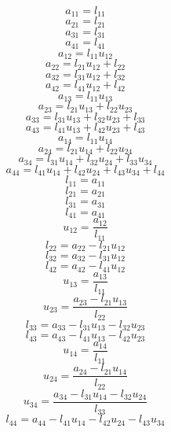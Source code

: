 \documentclass[10pt,a4paper,dvipdfmx]{article}
\begin{document}
\begin{multicols}{2}
$$ a_{{1}{1}} = l_{{1}{1}} $$
$$ a_{{2}{1}} = l_{{2}{1}} $$
$$ a_{{3}{1}} = l_{{3}{1}} $$
$$ a_{{4}{1}} = l_{{4}{1}} $$
$$ a_{{1}{2}} = l_{{1}{1}} u_{{1}{2}} $$
$$ a_{{2}{2}} = l_{{2}{1}} u_{{1}{2}} + l_{{2}{2}} $$
$$ a_{{3}{2}} = l_{{3}{1}} u_{{1}{2}} + l_{{3}{2}} $$
$$ a_{{4}{2}} = l_{{4}{1}} u_{{1}{2}} + l_{{4}{2}} $$
$$ a_{{1}{3}} = l_{{1}{1}} u_{{1}{3}} $$
$$ a_{{2}{3}} = l_{{2}{1}} u_{{1}{3}} + l_{{2}{2}} u_{{2}{3}} $$
$$ a_{{3}{3}} = l_{{3}{1}} u_{{1}{3}} + l_{{3}{2}} u_{{2}{3}} + l_{{3}{3}} $$
$$ a_{{4}{3}} = l_{{4}{1}} u_{{1}{3}} + l_{{4}{2}} u_{{2}{3}} + l_{{4}{3}} $$
$$ a_{{1}{4}} = l_{{1}{1}} u_{{1}{4}} $$
$$ a_{{2}{4}} = l_{{2}{1}} u_{{1}{4}} + l_{{2}{2}} u_{{2}{4}} $$
$$ a_{{3}{4}} = l_{{3}{1}} u_{{1}{4}} + l_{{3}{2}} u_{{2}{4}} + l_{{3}{3}} u_{{3}{4}} $$
$$ a_{{4}{4}} = l_{{4}{1}} u_{{1}{4}} + l_{{4}{2}} u_{{2}{4}} + l_{{4}{3}} u_{{3}{4}} + l_{{4}{4}} $$
\vfill\null
\columnbreak
$$ l_{{1}{1}} = a_{{1}{1}} $$
$$ l_{{2}{1}} = a_{{2}{1}} $$
$$ l_{{3}{1}} = a_{{3}{1}} $$
$$ l_{{4}{1}} = a_{{4}{1}} $$
$$ u_{{1}{2}} = \dfrac{a_{{1}{2}}}{l_{{1}{1}}} $$
$$ l_{{2}{2}} = a_{{2}{2}}- l_{{2}{1}} u_{{1}{2}} $$
$$ l_{{3}{2}} = a_{{3}{2}}- l_{{3}{1}} u_{{1}{2}} $$
$$ l_{{4}{2}} = a_{{4}{2}}- l_{{4}{1}} u_{{1}{2}} $$
$$ u_{{1}{3}} = \dfrac{a_{{1}{3}}}{l_{{1}{1}}} $$
$$ u_{{2}{3}} = \dfrac{a_{{2}{3}}- l_{{2}{1}} u_{{1}{3}}}{l_{{2}{2}}} $$
$$ l_{{3}{3}} = a_{{3}{3}}- l_{{3}{1}} u_{{1}{3}}- l_{{3}{2}} u_{{2}{3}} $$
$$ l_{{4}{3}} = a_{{4}{3}}- l_{{4}{1}} u_{{1}{3}}- l_{{4}{2}} u_{{2}{3}} $$
$$ u_{{1}{4}} = \dfrac{a_{{1}{4}}}{l_{{1}{1}}} $$
$$ u_{{2}{4}} = \dfrac{a_{{2}{4}}- l_{{2}{1}} u_{{1}{4}}}{l_{{2}{2}}} $$
$$ u_{{3}{4}} = \dfrac{a_{{3}{4}}- l_{{3}{1}} u_{{1}{4}}- l_{{3}{2}} u_{{2}{4}}}{l_{{3}{3}}} $$
$$ l_{{4}{4}} = a_{{4}{4}}- l_{{4}{1}} u_{{1}{4}}- l_{{4}{2}} u_{{2}{4}}- l_{{4}{3}} u_{{3}{4}} $$
\end{multicols}
\end{document}
